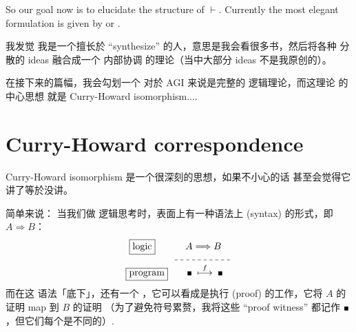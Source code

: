 So our goal now is to elucidate the structure of $\vdash$.  Currently the most elegant formulation is given by  or .

我发觉 我是一个擅长於 ``synthesize'' 的人，意思是我会看很多书，然后将各种 分散的 ideas 融合成一个 内部协调 的理论（当中大部分 ideas 不是我原创的）。

在接下来的篇幅，我会勾划一个 对於 AGI 来说是完整的 逻辑理论，而这理论 的中心思想 就是 Curry-Howard isomorphism....

\section{Curry-Howard correspondence}

Curry-Howard isomorphism 是一个很深刻的思想，如果不小心的话 甚至会觉得它讲了等於没讲。 


简单来说： 当我们做 逻辑思考时，表面上有一种语法上 (syntax) 的形式，即 $A \Rightarrow B$：
\begin{equation}
\label{eqn:Curry-Howard}
\begin{aligned}
\boxed{\mbox{logic}} \quad \quad \underdash{$A \Longrightarrow B$} & \\
\boxed{\mbox{program}} \quad \quad \witness \; \stackrel{f}{\longmapsto} \; \witness \hspace*{10pt} &
\end{aligned}
\end{equation}
而在这 语法「底下」，还有一个 ，它可以看成是执行  (proof) 的工作，它将 $A$ 的证明 map 到 $B$ 的证明 （为了避免符号累赘，我将这些 ``proof witness'' 都记作 $\witness$，但它们每个是不同的）.

